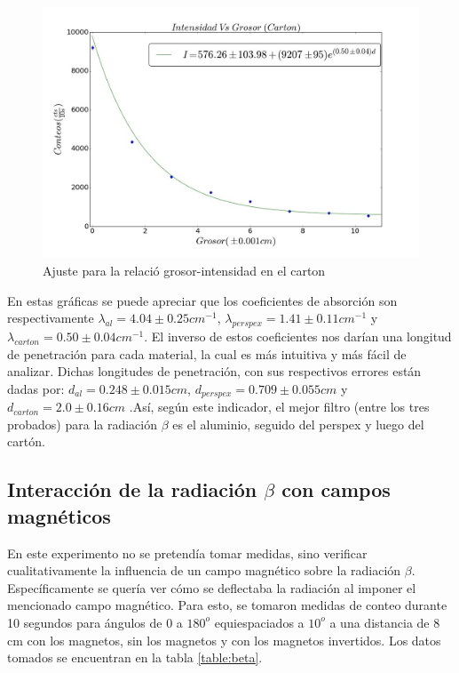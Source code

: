 \documentclass[%
 reprint,
 amsmath,amssymb,
 aps,
]{revtex4-1}
\begin{document}
\begin{figure}[h!]
\centering
\includegraphics[width=1.1\linewidth]{carton.jpg}
\caption{Ajuste para la relació grosor-intensidad en el carton}
\label{fig:carton}
\end{figure}


En estas gráficas se puede apreciar que los coeficientes de absorción son respectivamente $\lambda_{al} = 4.04\pm0.25cm^{-1}$, $\lambda_{perspex} = 1.41\pm0.11cm^{-1}$ y $\lambda_{carton} = 0.50\pm0.04cm^{-1}$. El inverso de estos coeficientes nos darían una longitud de penetración para cada material, la cual es más intuitiva y más fácil de analizar. Dichas longitudes de penetración, con sus respectivos errores están dadas por: $d_{al} = 0.248\pm0.015cm$, $d_{perspex} = 0.709\pm0.055cm$ y $d_{carton} = 2.0\pm0.16cm$ .Así, según este indicador, el mejor filtro (entre los tres probados) para la radiación $\beta$ es el aluminio, seguido del perspex y luego del cartón.\\

\subsection{\label{sec:level2}Interacción de la radiación $\beta$ con campos magnéticos}
En este experimento no se pretendía tomar medidas, sino verificar cualitativamente la influencia de un campo magnético sobre la radiación $\beta$. Específicamente se quería ver cómo se deflectaba la radiación al imponer el mencionado campo magnético. Para esto, se tomaron medidas de conteo durante 10 segundos para ángulos de $0$ a $180^o$ equiespaciados a $10^o$ a una distancia de 8 cm con los magnetos, sin los magnetos y con los magnetos invertidos. Los datos tomados se encuentran en la tabla \ref{table:beta}.\\
\end{document}
